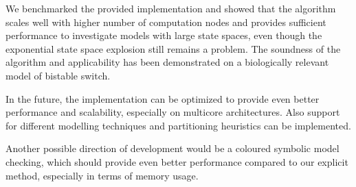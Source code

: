 \documentclass[12pt,oneside, draft]{fithesis2}
\begin{document}
		We benchmarked the provided implementation and showed that the algorithm scales well with higher number of computation nodes and provides sufficient performance to investigate models with large state spaces, even though the exponential state space explosion still remains a problem. The soundness of the algorithm and applicability has been demonstrated on a biologically relevant model of bistable switch.
		
		In the future, the implementation can be optimized to provide even better performance and scalability, especially on multicore architectures. Also support for different modelling techniques and partitioning heuristics can be implemented.
		
		Another possible direction of development would be a coloured symbolic model checking, which should provide even better performance compared to our explicit method, especially in terms of memory usage. 
		
		
		
			
					
      
	
	
\end{document}
